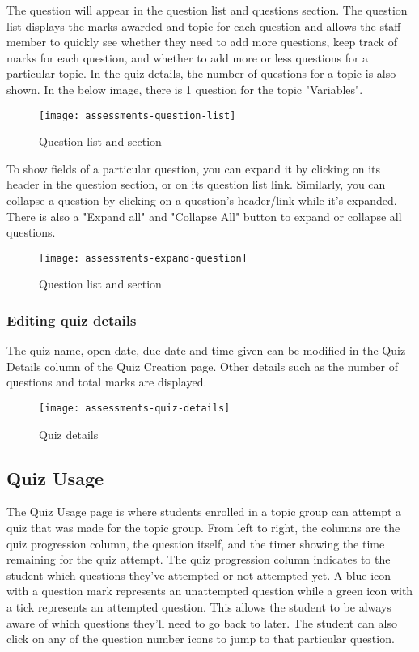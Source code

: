 The question will appear in the question list and questions section. The question list displays the marks awarded and topic for each question and allows the staff member to quickly see whether they need to add more questions, keep track of marks for each question, and whether to add more or less questions for a particular topic. In the quiz details, the number of questions for a topic is also shown. In the below image, there is 1 question for the topic "Variables".

\begin{figure}[!hbpt]
	\centering
	\texttt{[image: assessments-question-list]}
	\caption{Question list and section}
\end{figure}

To show fields of a particular question, you can expand it by clicking on its header in the question section, or on its question list link. Similarly, you can collapse a question by clicking on a question's header/link while it's expanded. There is also a "Expand all" and "Collapse All" button to expand or collapse all questions.

\begin{figure}[h!]
	\centering
	\texttt{[image: assessments-expand-question]}
	\caption{Question list and section}
\end{figure}


\subsubsection{Editing quiz details}
The quiz name, open date, due date and time given can be modified in the Quiz Details column of the Quiz Creation page. Other details such as the number of questions and total marks are displayed. 

\begin{figure}[h!]
	\centering
	\texttt{[image: assessments-quiz-details]}
	\caption{Quiz details}
\end{figure}


\subsection{Quiz Usage}
The Quiz Usage page is where students enrolled in a topic group can attempt a quiz that was made for the topic group. From left to right, the columns are the quiz progression column, the question itself, and the timer showing the time remaining for the quiz attempt. The quiz progression column indicates to the student which questions they've attempted or not attempted yet. A blue icon with a question mark represents an unattempted question while a green icon with a tick represents an attempted question. This allows the student to be always aware of which questions they'll need to go back to later. The student can also click on any of the question number icons to jump to that particular question. 

